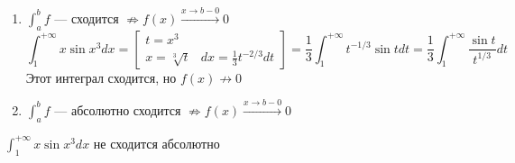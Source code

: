 \begin{remark}
    \begin{enumerate}
        \item $\int_a^b f$ --- сходится $\not\Rightarrow f(x)\xrightarrow{x\to b-0} 0$
        $$\int_1^{+\infty} x\sin x^3 dx = \left[\begin{array}{rl}
            t = x^3 &\\
            x = \sqrt[3]{t} & dx = \frac{1}{3}t^{-2/3}dt
        \end{array}\right] = \frac{1}{3} \int_1^{+\infty} t^{-1/3} \sin t dt = \frac{1}{3} \int_1^{+\infty} \frac{\sin t}{t^{1/3}} dt$$
        Этот интеграл сходится, но $f(x)\not\to0$
        \item $\int_a^b f$ --- абсолютно сходится $\not\Rightarrow f(x)\xrightarrow{x\to b-0} 0$
    \end{enumerate}
\end{remark}
\begin{exercise}
    $\int_1^{+\infty} x\sin x^3 dx$ не сходится абсолютно
\end{exercise}

